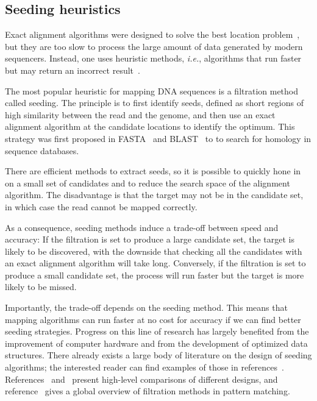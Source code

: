 \documentclass{article}
\begin{document}
\subsection{Seeding heuristics}
\label{sec:seedheur}

Exact alignment algorithms were designed to solve the best location
problem~\cite{pmid7265238, pmid5420325}, but they are too slow to process
the large amount of data generated by modern sequencers. Instead, one uses
heuristic methods, \textit{i.e.}, algorithms that run faster but may
return an incorrect result~\cite{Waterman1984}.

The most popular heuristic for mapping DNA sequences is a filtration
method called seeding. The principle is to first identify seeds,
defined as short regions of high similarity between the read and the
genome, and then use an exact alignment algorithm at the candidate
locations to identify the optimum. This strategy was first proposed in
FASTA~\cite{pmid2983426} and BLAST~\cite{pmid2231712} to to search for
homology in sequence databases.

There are efficient methods to extract seeds, so it is possible to quickly
hone in on a small set of candidates and to reduce the search space of the
alignment algorithm. The disadvantage is that the target may not be in the
candidate set, in which case the read cannot be mapped correctly.

As a consequence, seeding methods induce a trade-off between speed and
accuracy: If the filtration is set to produce a large candidate set, the
target is likely to be discovered, with the downside that checking all the
candidates with an exact alignment algorithm will take long. Conversely,
if the filtration is set to produce a small candidate set, the process
will run faster but the target is more likely to be missed.

Importantly, the trade-off depends on the seeding method. This means that
mapping algorithms can run faster at no cost for accuracy if we can find
better seeding strategies. Progress on this line of research has largely
benefited from the improvement of computer hardware and from the
development of optimized data structures. There already exists a large
body of literature on the design of seeding algorithms; the interested
reader can find examples of those in references~\cite{sun2005designing,
pmid11934743, xu2006optimizing, kucherov2005multiseed, brejova2003vector,
pmid18684737, pmid15359419}. References~\cite{pmid16533404}
and~\cite{pmid20460430} present high-level comparisons of different
designs, and reference~\cite{navarro2001guided} gives a global overview of
filtration methods in pattern matching.
\end{document}
